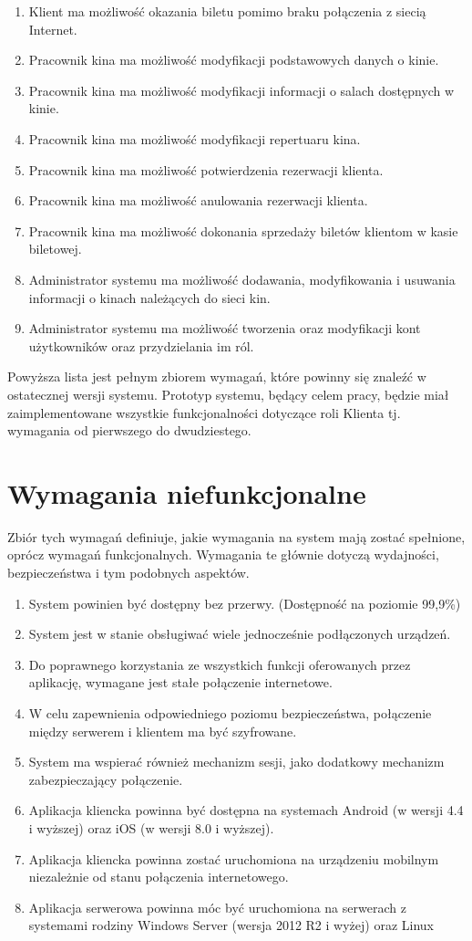 \begin{enumerate}
\item Klient ma możliwość okazania biletu pomimo braku połączenia z siecią Internet.\newline
\item Pracownik kina ma możliwość modyfikacji podstawowych danych o kinie.
\item Pracownik kina ma możliwość modyfikacji informacji o salach dostępnych w kinie.
\item Pracownik kina ma możliwość modyfikacji repertuaru kina.
\item Pracownik kina ma możliwość potwierdzenia rezerwacji klienta.
\item Pracownik kina ma możliwość anulowania rezerwacji klienta.
\item Pracownik kina ma możliwość dokonania sprzedaży biletów klientom w kasie biletowej.
\item Administrator systemu ma możliwość dodawania, modyfikowania i usuwania informacji o kinach należących do sieci kin.
\item Administrator systemu ma możliwość tworzenia oraz modyfikacji kont użytkowników oraz przydzielania im ról.
\end{enumerate}
Powyższa lista jest pełnym zbiorem wymagań, które powinny się znaleźć w ostatecznej wersji systemu. Prototyp systemu, będący celem pracy, będzie miał zaimplementowane wszystkie funkcjonalności dotyczące roli Klienta tj. wymagania od pierwszego do dwudziestego.
\section{Wymagania niefunkcjonalne}
Zbiór tych wymagań definiuje, jakie wymagania na system mają zostać spełnione, oprócz wymagań funkcjonalnych. Wymagania te głównie dotyczą wydajności, bezpieczeństwa i tym podobnych aspektów.
\begin{enumerate}
\item System powinien być dostępny bez przerwy. (Dostępność na poziomie 99,9\%)
\item System jest w stanie obsługiwać wiele jednocześnie podłączonych urządzeń.
\item Do poprawnego korzystania ze wszystkich funkcji oferowanych przez aplikację, wymagane jest stałe połączenie internetowe.
\item W celu zapewnienia odpowiedniego poziomu bezpieczeństwa, połączenie między serwerem i klientem ma być szyfrowane.
\item System ma wspierać również mechanizm sesji, jako dodatkowy mechanizm zabezpieczający połączenie.
\item Aplikacja kliencka powinna być dostępna na systemach Android (w wersji 4.4 i wyższej) oraz iOS (w wersji 8.0 i wyższej).
\item Aplikacja kliencka powinna zostać uruchomiona na urządzeniu mobilnym niezależnie od stanu połączenia internetowego.
\item Aplikacja serwerowa powinna móc być uruchomiona na serwerach z systemami rodziny Windows Server (wersja 2012 R2 i wyżej) oraz Linux

\end{enumerate}
